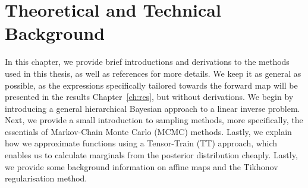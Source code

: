 \the\columnwidth
\chapter{Theoretical and Technical Background}
\label{ch:background}
In this chapter, we provide brief introductions and derivations to the methods used in this thesis, as well as references for more details. We keep it as general as possible, as the expressions specifically tailored towards the forward map will be presented in the results Chapter~\ref{ch:res}, but without derivations.
We begin by introducing a general hierarchical Bayesian approach to a linear inverse problem.
Next, we provide a small introduction to sampling methods, more specifically, the essentials of Markov-Chain Monte Carlo (MCMC) methods.
Lastly, we explain how we approximate functions using a Tensor-Train (TT) approach, which enables us to calculate marginals from the posterior distribution cheaply.
Lastly, we provide some background information on affine maps and the Tikhonov regularisation method.

